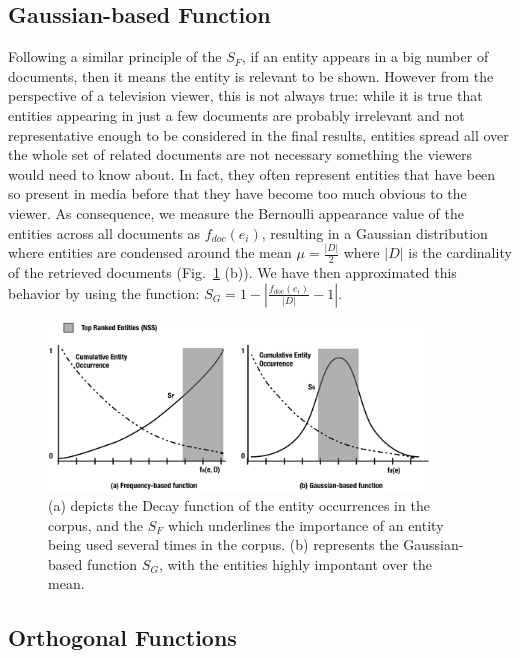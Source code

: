\documentclass{llncs}
\begin{document}
\subsection{Gaussian-based Function}
Following a similar principle of the $S_F$, if an entity appears in a big number of documents, then it means the entity is relevant to be shown. However from the perspective of a television viewer, this is not always true: while it is true that entities appearing in just a few documents are probably irrelevant and not representative enough to be considered in the final results, entities spread all over the whole set of related documents are not necessary something the viewers would need to know about. In fact, they often represent entities that have been so present in media before that they have become too much obvious to the viewer. As consequence, we measure the Bernoulli appearance value of the entities across all documents as $f_{doc}(e_i)$, resulting in a Gaussian distribution where entities are condensed around the mean $\mu = \frac{|D|}{2}$ where $|D|$ is the cardinality of the retrieved documents (Fig.~\ref{fig:rankingStrategies} (b)). We have then approximated this behavior by using the function: $S_G = 1-\left | \frac{ f_{doc}(e_i) }{|D|} -1 \right |$.

\begin{figure}[h!]
\centering
\includegraphics[width=0.9\textwidth]{figure/RankingStrategies}
\caption{(a) depicts the Decay function of the entity occurrences in the corpus, and the $S_F$ which underlines the importance of an entity being used several times in the corpus. (b) represents the Gaussian-based function $S_G$, with the entities highly impontant over the mean.}
\label{fig:rankingStrategies}%
\end{figure}



\subsection{Orthogonal Functions}
\end{document}
